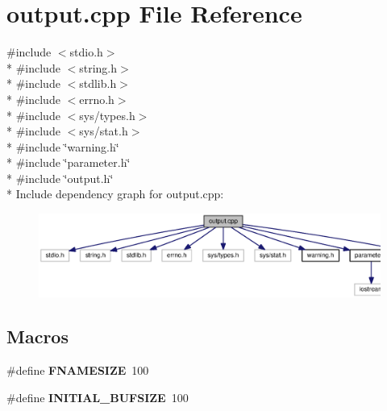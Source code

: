 \section{output.\-cpp File Reference}
\label{output_8cpp}
{\ttfamily \#include $<$stdio.\-h$>$}\\*
{\ttfamily \#include $<$string.\-h$>$}\\*
{\ttfamily \#include $<$stdlib.\-h$>$}\\*
{\ttfamily \#include $<$errno.\-h$>$}\\*
{\ttfamily \#include $<$sys/types.\-h$>$}\\*
{\ttfamily \#include $<$sys/stat.\-h$>$}\\*
{\ttfamily \#include \char`\"{}warning.\-h\char`\"{}}\\*
{\ttfamily \#include \char`\"{}parameter.\-h\char`\"{}}\\*
{\ttfamily \#include \char`\"{}output.\-h\char`\"{}}\\*
Include dependency graph for output.\-cpp\-:
\nopagebreak
\begin{figure}[H]
\begin{center}
\leavevmode
\includegraphics[width=350pt]{output_8cpp__incl}
\end{center}
\end{figure}
\subsection*{Macros}
\begin{DoxyCompactItemize}
\item 
\#define {\bf F\-N\-A\-M\-E\-S\-I\-Z\-E}~100
\item 
\#define {\bf I\-N\-I\-T\-I\-A\-L\-\_\-\-B\-U\-F\-S\-I\-Z\-E}~100
\end{DoxyCompactItemize}
